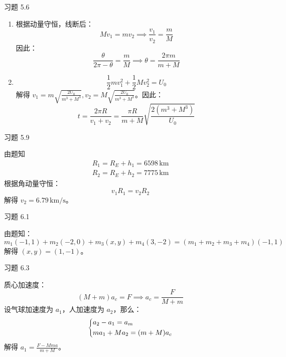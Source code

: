 \begin{problem}
    习题 5.6
    \begin{solution}
        \begin{enumerate}
            \item[\textbf{1)}] 根据动量守恒，线断后：
            $$
            M v_1 = m v_2 \implies \frac{v_1}{v_2} = \frac{m}{M}
            $$
            因此：
            $$
            \frac{\theta}{2\pi - \theta} = \frac{m}{M} \implies \theta = \frac{2\pi m}{m + M}
            $$

            \item[\textbf{2)}]
            $$
            \frac{1}{2} m v_1^2 + \frac{1}{2} M v_2^2 = U_0
            $$
            解得 $v_1 = m \sqrt{\frac{2 U_0}{m^3 + M^3}}, v_2 = M \sqrt{\frac{2 U_0}{m^3 + M^3}}$。因此：
            $$
            t = \frac{2 \pi R}{v_1 + v_2} = \frac{\pi R}{m + M} \sqrt{\frac{2 (m^3 + M^3)}{U_0}}
            $$
        \end{enumerate}
    \end{solution}
\end{problem}

\begin{problem}
    习题 5.9
    \begin{solution}
        由题知
        $$
        \begin{gathered}
            R_1 = R_E + h_1 = 6598 \,\mathrm{km} \\
            R_2 = R_E + h_2 = 7775 \,\mathrm{km}
        \end{gathered}
        $$
        根据角动量守恒：
        $$
        v_1 R_1 = v_2 R_2
        $$
        解得 $v_2 = 6.79 \,\mathrm{km / s}$。
    \end{solution}
\end{problem}

\begin{problem}
    习题 6.1
    \begin{solution}
        由题知：
        $$
        m_1 (-1, 1) + m_2 (-2, 0) + m_3 (x, y) + m_4 (3, -2) = (m_1 + m_2 + m_3 + m_4) (-1, 1)
        $$
        解得 $(x, y) = (1, -1)$。
    \end{solution}
\end{problem}

\begin{problem}
    习题 6.3
    \begin{solution}
        质心加速度：
        $$
        (M + m) a_c = F \implies a_c = \frac{F}{M + m}
        $$
        设气球加速度为 $a_1$，人加速度为 $a_2$，那么：
        $$
        \begin{dcases}
            a_2 - a_1 = a_m \\
            m a_1 + M a_2 = (m + M) a_c
        \end{dcases}
        $$
        解得 $a_1 = \frac{F - M m a}{m + M}$。
    \end{solution}
\end{problem}